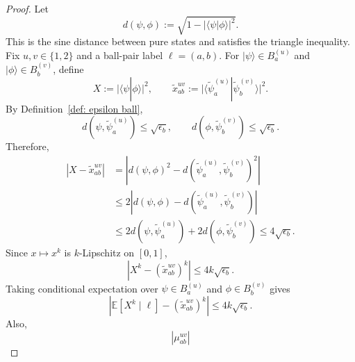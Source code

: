 \documentclass[aps,prx,reprint,superscriptaddress,amsmath,amssymb,longbibliography,floatfix]{revtex4-2}
\newcommand{\abs}[1]{\lvert #1\rvert}
\newcommand{\Abs}[1]{\left\lvert #1\right\rvert}
\providecommand{\ket}[1]{|#1 \rangle}
\providecommand{\braket}[2]{\langle #1|#2 \rangle}
\newcommand{\dsE}{\mathbb{E}}
\theoremstyle{plain}
\theoremstyle{definition}
\theoremstyle{remark}
\begin{document}
\begin{proof}
    Let
    \begin{equation}
        d(\psi,\phi):=\sqrt{1-\abs{\braket{\psi}{\phi}}^2}.
    \end{equation}
    This is the sine distance between pure states and satisfies the triangle inequality. Fix $u,v\in\{1,2\}$ and a ball-pair label $\ell=(a,b)$. For $\ket{\psi}\in B_a^{(u)}$ and $\ket{\phi}\in B_b^{(v)}$, define
    \begin{equation}
        X:=\abs{\braket{\psi}{\phi}}^2,
        \qquad
        \widetilde{x}_{ab}^{uv}
        :=
        \abs{
            \braket{\widetilde{\psi}_a^{(u)}}{\widetilde{\psi}_b^{(v)}}
        }^2 .
    \end{equation}
    By Definition~\ref{def: epsilon ball},
    \begin{equation}
        d(\psi,\widetilde{\psi}_a^{(u)})\le\sqrt{\epsilon_b},
        \qquad
        d(\phi,\widetilde{\psi}_b^{(v)})\le\sqrt{\epsilon_b}.
    \end{equation}
    Therefore,
    \begin{align}
        \Abs{X-\widetilde{x}_{ab}^{uv}}
        &=
        \Abs{
            d(\psi,\phi)^2
            -
            d(\widetilde{\psi}_a^{(u)},\widetilde{\psi}_b^{(v)})^2
        } \nonumber\\
        &\le
        2\Abs{
            d(\psi,\phi)
            -
            d(\widetilde{\psi}_a^{(u)},\widetilde{\psi}_b^{(v)})
        } \nonumber\\
        &\le
        2d(\psi,\widetilde{\psi}_a^{(u)})
        +
        2d(\phi,\widetilde{\psi}_b^{(v)})
        \le
        4\sqrt{\epsilon_b}.
    \end{align}
    Since $x\mapsto x^k$ is $k$-Lipschitz on $[0,1]$,
    \begin{equation}
        \Abs{X^k-(\widetilde{x}_{ab}^{uv})^k}
        \le
        4k\sqrt{\epsilon_b}.
        \label{eq: epsilon ball pointwise kth moment}
    \end{equation}
    Taking conditional expectation over $\psi\in B_a^{(u)}$ and $\phi\in B_b^{(v)}$ gives
    \begin{equation}
        \Abs{
            \dsE[X^k\mid \ell]
            -
            (\widetilde{x}_{ab}^{uv})^k
        }
        \le
        4k\sqrt{\epsilon_b}.
        \label{eq: conditional kth moment to center}
    \end{equation}
    Also,
    \begin{equation}
        \Abs{
            \mu_{ab}^{uv}
}
\end{equation}
\end{proof}
\end{document}
